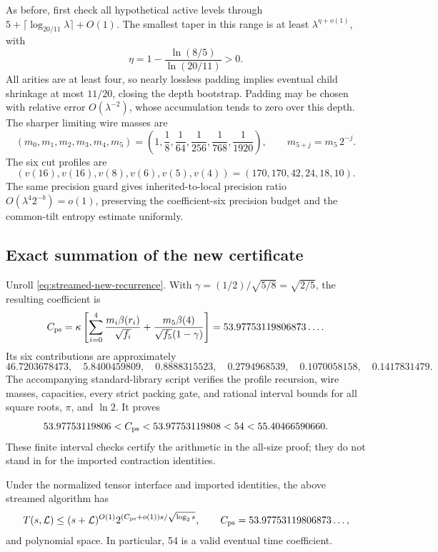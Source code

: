 As before, first check all hypothetical active levels through
$5+\lceil\log_{20/11}\lambda\rceil+O(1)$. The smallest taper in this range
is at least $\lambda^{\eta+o(1)}$, with
\[
 \eta=1-\frac{\ln(8/5)}{\ln(20/11)}>0.
\]
All arities are at least four, so nearly lossless padding implies eventual
child shrinkage at most $11/20$, closing the depth bootstrap. Padding may be
chosen with relative error $O(\lambda^{-2})$, whose accumulation tends to
zero over this depth. The sharper limiting wire masses are
\[
 (m_0,m_1,m_2,m_3,m_4,m_5)=
 \left(1,\frac18,\frac1{64},\frac1{256},
           \frac1{768},\frac1{1920}\right),
 \qquad m_{5+j}=m_5\,2^{-j}.
\]
The six cut profiles are
\[
 (v(16),v(16),v(8),v(6),v(5),v(4))
       =(170,170,42,24,18,10).
\]
The same precision guard gives inherited-to-local precision ratio
$O(\lambda^4 2^{-b})=o(1)$, preserving the coefficient-six precision budget
and the common-tilt entropy estimate uniformly.

\subsection{Exact summation of the new certificate}

Unroll \eqref{eq:streamed-new-recurrence}. With
$\gamma=(1/2)/\sqrt{5/8}=\sqrt{2/5}$, the resulting coefficient is
\begin{equation}\label{eq:streamed-new-coefficient}
 C_{\rm ps}=\kappa\left[
 \sum_{i=0}^4\frac{m_i\beta(r_i)}{\sqrt{f_i}}
 +\frac{m_5\beta(4)}{\sqrt{f_5}(1-\gamma)}
 \right]
 =53.97753119806873\ldots.
\end{equation}
Its six contributions are approximately
\[
 46.7203678473,\quad5.8400459809,\quad0.8888315523,\quad
 0.2794968539,\quad0.1070058158,\quad0.1417831479.
\]
The accompanying standard-library script verifies the profile recursion,
wire masses, capacities, every strict packing gate, and rational interval
bounds for all square roots, $\pi$, and $\ln2$. It proves
\[
 53.97753119806<C_{\rm ps}<53.97753119808<54
      <55.40466590660.
\]
These finite interval checks certify the arithmetic in the all-size proof;
they do not stand in for the imported contraction identities.

\begin{theorem}
\label{thm:streamed-new}
Under the normalized tensor interface and imported identities, the above
streamed algorithm has
\[
 T(s,\mathcal L)\le(s+\mathcal L)^{O(1)}
       2^{(C_{\rm ps}+o(1))s/\sqrt{\log_2s}},
 \qquad C_{\rm ps}=53.97753119806873\ldots,
\]
and polynomial space. In particular, 54 is a valid eventual time
coefficient.
\end{theorem}

